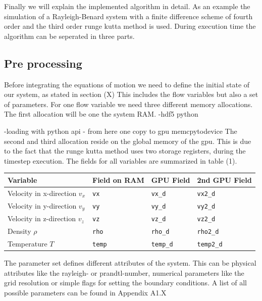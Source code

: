 Finally we will explain the implemented algorithm in detail.
As an example the simulation of a Rayleigh-Benard system with a finite difference scheme of fourth order
and the third order runge kutta method is  used.
During execution time the algorithm can be seperated in three parts.

\subsection{Pre processing}

Before integrating the equations of motion we need to define the initial state of our system, as stated in section (X)
This includes the flow variables but also a set of parameters.
For one flow variable we need three different memory allocations.
The first allocation will be one the system RAM.
-hdf5 python


-loading with python api
- from here one copy to gpu memcpytodevice
The second and third allocation reside on the global memory of the gpu.
This is due to the fact that the runge kutta method uses two storage registers, during the timestep execution.
The fields for all variables are summarized in table (1).

\begin{center}
    \begin{tabular}{ | l | l | l | l |}
    \hline
    Variable & Field on RAM & GPU Field & 2nd GPU Field \\
    \hline
    Velocity in x-direction $v_x$  & \texttt{vx}   &  \texttt{vx\_d}   & \texttt{vx2\_d}   \\
    Velocity in y-direction $v_y$  & \texttt{vy}   &  \texttt{vy\_d}   & \texttt{vy2\_d}   \\
    Velocity in z-direction $v_z$  & \texttt{vz}   &  \texttt{vz\_d}   & \texttt{vz2\_d}   \\
    Density  $\rho$  & \texttt{rho}  &  \texttt{rho\_d}  & \texttt{rho2\_d}  \\
    Temperature $T$ & \texttt{temp} &  \texttt{temp\_d} & \texttt{temp2\_d} \\
    \hline
    \end{tabular}
\end{center}

The parameter set defines different attributes of the system.
This can be physical attributes like the rayleigh- or prandtl-number, numerical parameters like the grid resolution
or simple flags for setting the boundary conditions. A list of all possible parameters can be found in Appendix A1.X


